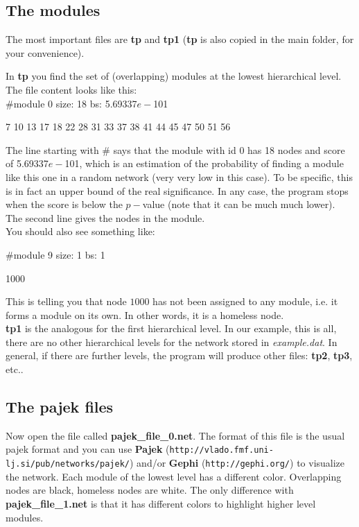 \documentclass[11pt]{article}
\begin{document}
\subsection{The modules}
\label{sec2.1}

The most important files are \textbf{tp} and \textbf{tp1} (\textbf{tp} is also copied in the main folder, for your convenience).

In \textbf{tp} you find the set of (overlapping) modules at the lowest hierarchical level. The file content looks like this:
\\

\#module 0 size: 18 bs: 5.69337$e-$101

7 10 13 17 18 22 28 31 33 37 38 41 44 45 47 50 51 56


{\footnotesize The line starting with \# says that the module with id 0 has 18
nodes 
and score of 5.69337$e-$101, which is an estimation of 
the probability of finding a module 
like this one in a random network (very very low in this case). To be specific, this is in fact an upper bound of the real significance. In any case, 
the program stops when the score is below the $p-$value (note that it can be much much lower). 
The second line gives the nodes in the module.}
\\

You should also see something like:

\#module 9 size: 1 bs: 1

1000

{\footnotesize This is telling you that node $1000$ has not been
  assigned to any module, i.e. it forms a module on its own. In other words, it is a homeless node.}
\\

\textbf{tp1} is the analogous for the first hierarchical level. In our example, this is all, there are no other hierarchical levels for the network stored
in {\it example.dat}. In general, if there are further levels, the
program will produce other files: {\bf tp2}, {\bf tp3}, etc..
\\

\subsection{The pajek files}


Now open the file called \textbf{pajek\_file\_0.net}. The format of
this file is the usual pajek format and you can use {\bf Pajek}
({\tt http://vlado.fmf.uni-lj.si/pub/networks/pajek/}) and/or {\bf Gephi}
({\tt http://gephi.org/}) to visualize the network. 
Each module of the lowest level has a different color. Overlapping nodes are
black, homeless nodes are white. 
The only difference with \textbf{pajek\_file\_1.net} is that it has different colors to highlight higher level modules.
\end{document}
